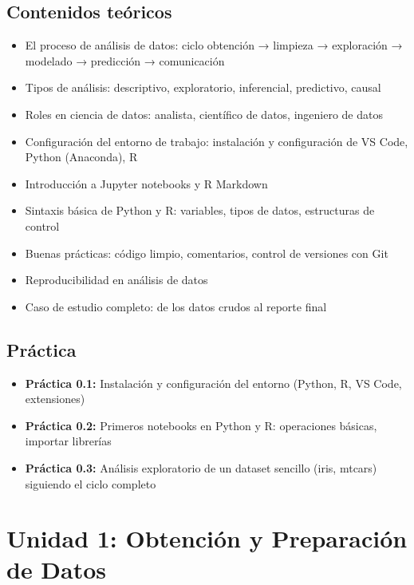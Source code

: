 \documentclass[a4paper,11pt]{article}
\begin{document}
\subsection{Contenidos teóricos}
\begin{itemize}[leftmargin=*]
    \item El proceso de análisis de datos: ciclo obtención → limpieza → exploración → modelado → predicción → comunicación
    \item Tipos de análisis: descriptivo, exploratorio, inferencial, predictivo, causal
    \item Roles en ciencia de datos: analista, científico de datos, ingeniero de datos
    \item Configuración del entorno de trabajo: instalación y configuración de VS Code, Python (Anaconda), R
    \item Introducción a Jupyter notebooks y R Markdown
    \item Sintaxis básica de Python y R: variables, tipos de datos, estructuras de control
    \item Buenas prácticas: código limpio, comentarios, control de versiones con Git
    \item Reproducibilidad en análisis de datos
    \item Caso de estudio completo: de los datos crudos al reporte final
\end{itemize}

\subsection{Práctica}
\begin{itemize}[leftmargin=*, labelindent=0pt, label={\textcolor{practicacolor}{$\blacktriangleright$}}]
    \item \textbf{Práctica 0.1:} Instalación y configuración del entorno (Python, R, VS Code, extensiones)
    \item \textbf{Práctica 0.2:} Primeros notebooks en Python y R: operaciones básicas, importar librerías
    \item \textbf{Práctica 0.3:} Análisis exploratorio de un dataset sencillo (iris, mtcars) siguiendo el ciclo completo
\end{itemize}

\section{Unidad 1: Obtención y Preparación de Datos}
\end{document}
